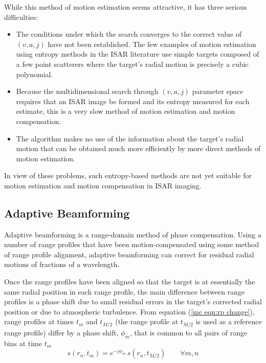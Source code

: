 While this method of motion estimation seems attractive, it has three
serious difficulties:
\begin{itemize}
\item The conditions under which the search converges to the correct 
value of $(v,a,j)$ have not been established. The few examples of motion
estimation using entropy methods in the ISAR literature use simple targets
composed of a few point scatterers where the target's radial motion is
precisely a cubic polynomial.
\item Because the multidimensional search through $(v,a,j)$ parameter
space requires that an ISAR image be formed and its entropy measured
for each estimate, this is a very slow method of motion estimation and
motion compensation.  
\item The algorithm makes no use of the information about the target's
radial motion that can be obtained much more efficiently by more direct 
methods of motion estimation.
\end{itemize}
In view of these problems, such entropy-based methods are not yet suitable
for motion estimation and motion compensation in ISAR imaging.


\subsection{Adaptive Beamforming}
\label{mc sec:ab}

Adaptive beamforming is a range-domain method of phase compensation.  Using
a number of range profiles that have been motion-compensated using some method of range
profile alignment, adaptive beamforming can correct for residual radial motions
of fractions of a wavelength. 

Once the range profiles have been aligned so that the target is at
essentially the same radial position in each range profile, the main
difference between range profiles is a phase shift due to small residual
errors in the target's corrected radial position or due to atmospheric
turbulence.  From equation (\ref{mc eqn:rp change}), range profiles at
times $t_m$ and $t_{M/2}$ (the range profile at $t_{M/2}$ is used as a
reference range profile) differ by a phase shift, $\phi_m$, that is common
to all pairs of range bins at time $t_m$
\begin{equation}
s(r_n,t_m)= e^{-j\phi_m}\,s(r_n,t_{M/2})\qquad\forall m,n
\end{equation}


